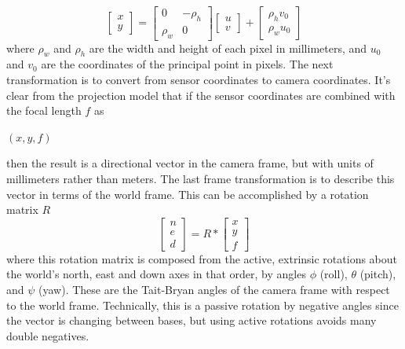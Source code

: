 \[
\begin{bmatrix} x \\ y \end{bmatrix}
=
\begin{bmatrix} 
 0 & -\rho_h \\
 \rho_w & 0 
\end{bmatrix}
\begin{bmatrix} u \\ v \end{bmatrix}
+
\begin{bmatrix} \rho_h v_0 \\ \rho_w u_0 \end{bmatrix}
\]
 where $\rho_w$ and $\rho_h$ are the width and height of each pixel in millimeters, and $u_0$ and $v_0$ are the coordinates of the principal point in pixels.   The next transformation is to convert from sensor coordinates to camera coordinates.  It's clear from the projection model that if the sensor coordinates are combined with the focal length $f$ as
 \begin{center}
 $(x,y,f)$
 \end{center}
 then the result is a directional vector in the camera frame, but with units of millimeters rather than meters. The last frame transformation is to describe this vector in terms of the world frame.  This can be accomplished by a rotation matrix $R$
 \begin{equation}
 \label{rotation_eq}
 \begin{bmatrix} n \\ e \\ d \end{bmatrix}
 =
 R *
 \begin{bmatrix} x \\ y \\ f \end{bmatrix}
 \end{equation}
 where this rotation matrix is composed from the active, extrinsic rotations about the world's north, east and down axes in that order, by angles $\phi$ (roll), $\theta$ (pitch), and $\psi$ (yaw).  These are the Tait-Bryan angles of the camera frame with respect to the world frame.  Technically, this is a passive rotation by negative angles since the vector is changing between bases, but using active rotations avoids many double negatives.
